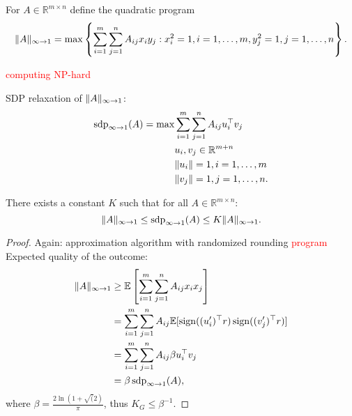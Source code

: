 \begin{dfn}
	For $A\in\mathbb{R}^{m\times n}$ define the quadratic program
	\begin{equation}
		 \Vert {A} \Vert_{\infty\to 1} = \max \left\{ \sum_{i=1}^m \sum_{j=1}^n A_{ij} x_i y_j : x_i^2=1, i=1,\dots,m, y_j^2=1, j =1,\dots,n \right\}.
	\end{equation}
\end{dfn}
\textcolor{red}{computing NP-hard}
\begin{dfn}
	SDP relaxation of $ \Vert {A} \Vert_{\infty\to1}$:
	\begin{align*}
		\operatorname{sdp}_{\infty\to 1} (A) = \max 
		&\sum_{i=1}^m\sum_{j=1}^n A_{ij} u_i^\top v_j\\
		&u_i,v_j\in\mathbb{R}^{m+n}\\
		& \Vert {u_i} \Vert=1, i=1,\dots,m\\
		& \Vert {v_j} \Vert=1, j=1,\dots,n.
	\end{align*}
\end{dfn}
\begin{theo} \label{eq:G_ineq}
	There exists a constant $K$ such that for all $A\in\mathbb{R}^{m\times n}$:
	\begin{equation}
		 \Vert {A} \Vert_{\infty\to 1} \leq \operatorname{sdp}_{\infty\to 1} (A) \leq K  \Vert {A} \Vert_{\infty\to 1}.
	\end{equation}
\end{theo}
\begin{proof}
	Again: approximation algorithm with randomized rounding
	\textcolor{red}{program}
	Expected quality of the outcome:
	\begin{align*}
		 \Vert {A} \Vert_{\infty\to 1} &\geq \mathbb{E}\left[\sum_{i=1}^m\sum_{j=1}^n A_{ij}x_ix_j\right]\\
		&= \sum_{i=1}^m\sum_{j=1}^n A_{ij} \mathbb{E}[\operatorname{sign}((u_i^\prime)^\top r) \operatorname{sign}((v_j^\prime)^\top r)] \\
		&=\sum_{i=1}^m\sum_{j=1}^n A_{ij}\beta u_i^\top v_j \\
		&=\beta \operatorname{sdp}_{\infty\to 1}(A),
	\end{align*}
	where $\beta = \frac{2\ln(1+\sqrt(2)}{\pi}$, thus $K_G\leq \beta^{-1}$.
\end{proof}
\newpage